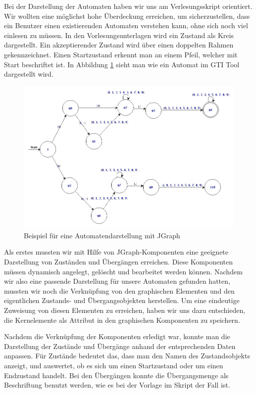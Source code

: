 Bei der Darstellung der Automaten haben wir uns am Verlesungsskript \cite{Sieber}
orientiert. Wir wollten eine möglichst hohe Überdeckung erreichen, um
sicherzustellen, dass ein Benutzer einen existierenden Automaten verstehen kann,
ohne sich noch viel einlesen zu müssen. In den Vorlesungsunterlagen wird ein
Zustand als Kreis dargestellt. Ein akzeptierender Zustand wird über einen
doppelten Rahmen gekennzeichnet. Einen Startzustand erkennt man an einem Pfeil,
welcher mit Start beschriftet ist. In Abbildung \ref{FigureMachine} sieht man
wie ein Automat im GTI Tool dargestellt wird.\vspace{10pt}

\begin{figure}[h!]
\begin{center}
\includegraphics[width=12cm]{../images/enfa_example.png}
\caption{Beispiel für eine Automatendarstellung mit JGraph}
\label{FigureMachine}
\end{center}
\end{figure}
\vspace{10pt}

Als erstes mussten wir mit Hilfe von JGraph-Komponenten eine geeignete
Darstellung von Zuständen und Übergängen erreichen. Diese Komponenten müssen
dynamisch angelegt, gelöscht und bearbeitet werden können. Nachdem wir also eine
passende Darstellung für unsere Automaten gefunden hatten, mussten wir noch die
Verknüpfung von den graphischen Elementen und den eigentlichen Zustands- und
Übergangsobjekten herstellen. Um eine eindeutige Zuweisung von diesen Elementen
zu erreichen, haben wir uns dazu entschieden, die Kernelemente als Attribut in
den graphischen Komponenten zu speichern.\vspace{10pt}

Nachdem die Verknüpfung der Komponenten erledigt war, konnte man die Darstellung
der Zustände und Übergänge anhand der entsprechenden Daten anpassen. Für Zustände bedeutet
das, dass man den Namen des Zustandsobjekts anzeigt, und auswertet,
ob es sich um einen Startzustand oder um einen Endzustand handelt. Bei den
Übergängen konnte die Übergangsmenge als Beschriftung benutzt werden, wie es bei
der Vorlage im Skript der Fall ist.\vspace{10pt}


